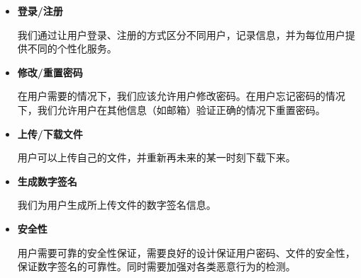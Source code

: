 \begin{itemize}
	
	\item \textbf{登录/注册}
	
	我们通过让用户登录、注册的方式区分不同用户，记录信息，并为每位用户提供不同的个性化服务。
	
	\item \textbf{修改/重置密码}
	
	在用户需要的情况下，我们应该允许用户修改密码。在用户忘记密码的情况下，我们允许用户在其他信息（如邮箱）验证正确的情况下重置密码。
	
	\item \textbf{上传/下载文件}
	
	用户可以上传自己的文件，并重新再未来的某一时刻下载下来。
	
	\item \textbf{生成数字签名}
	
	我们为用户生成所上传文件的数字签名信息。
	
	\item \textbf{安全性}
	
	用户需要可靠的安全性保证，需要良好的设计保证用户密码、文件的安全性，保证数字签名的可靠性。同时需要加强对各类恶意行为的检测。

\end{itemize}

